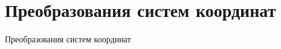 \documentclass[10pt]{beamer}
\begin{document}
\section{Преобразования систем координат}

\frame{\sectionpage}


\begin{frame}{Преобразования систем координат}
	{
		}
\end{frame}
\end{document}

